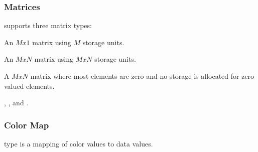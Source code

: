 

\subsubsection{Matrices}

\sr{} supports three matrix types: 

\begin{description}
 An \(Mx1\) matrix using \(M\)
storage units.

 An \(MxN\) matrix using \(MxN\)
storage units.

 A \(MxN\) matrix where most
elements are zero and no storage is allocated for zero valued
elements.
\end{description}

,
, and .

\subsubsection{Color Map}

\sr{}  type is a mapping of color values to data values.

